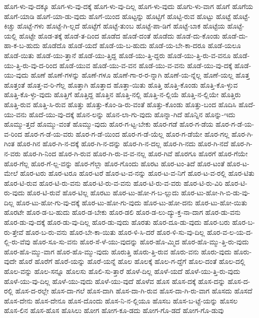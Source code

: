 {ಹೊಗ-ಳು-ವು-ದಕ್ಕೂ
ಹೊಗ-ಳು-ವು-ದಕ್ಕೆ
ಹೊಗ-ಳು-ವು-ದಿಲ್ಲ
ಹೊಗ-ಳು-ವುದು
ಹೊಗು-ಳು-ವಾಗ
ಹೊಗೆ
ಹೊಗೆಯ
ಹೊಗೆ-ಯಾಡಿ
ಹೊಗೆ-ಯಾ-ಡು-ವುದು
ಹೊಗೆ-ಯಿಂದ
ಹೊಟ್ಟನ್ನು
ಹೊಟ್ಟಿಗೆ
ಹೊಟ್ಟಿ-ರುವ
ಹೊಟ್ಟು
ಹೊಟ್ಟೆ
ಹೊಟ್ಟೆ-ಕಿಚ್ಚು
ಹೊಟ್ಟೆ-ಗಳು
ಹೊಟ್ಟೆ-ಗಿ-ಲ್ಲದೆ
ಹೊಟ್ಟೆಗೆ
ಹೊಟ್ಟೆ-ತುಂಬ
ಹೊಟ್ಟೆ-ಪಾ-ಡಿಗೆ
ಹೊಟ್ಟೆ-ಬಾಕ
ಹೊಟ್ಟೆಯ
ಹೊಟ್ಟೆ-ಯಲ್ಲಿ
ಹೊಟ್ಟೇ
ಹೊಡ-ತಕ್ಕೆ
ಹೊಡೆ-ತ-ದಿಂದ
ಹೊಡೆದ
ಹೊಡೆ-ದಂತೆ
ಹೊಡೆದು
ಹೊಡೆ-ದು-ಕೊಂಡು
ಹೊಡೆ-ದು-ಹಾ-ಕ-ಬ-ಹುದು
ಹೊಡೆದೊ
ಹೊಡೆ-ಯದೆ
ಹೊಡೆ-ಯ-ಬ-ಹುದು
ಹೊಡೆ-ಯ-ಬೇ-ಕಾ-ದರೂ
ಹೊಡೆ-ಯಲೂ
ಹೊಡೆ-ಯಿತು
ಹೊಡೆ-ಯು-ತ್ತಾನೆ
ಹೊಡೆ-ಯು-ತ್ತಿದ್ದ
ಹೊಡೆ-ಯು-ತ್ತಿ-ದ್ದರು
ಹೊಡೆ-ಯು-ತ್ತಿ-ರು-ವ-ವನೂ
ಹೊಡೆ-ಯು-ತ್ತಿ-ರು-ವು-ದ-ರಿಂದ
ಹೊಡೆ-ಯುವ
ಹೊಡೆ-ಯು-ವ-ವನ
ಹೊಡೆ-ಯು-ವ-ವನು
ಹೊಡೆ-ಯು-ವು-ದಕ್ಕೆ
ಹೊಡೆ-ಯು-ವುದು
ಹೊಣೆ
ಹೊಣೆ-ಗಳನ್ನು
ಹೊಣೆ-ಗಳೂ
ಹೊಣೆ-ಗಾ-ರ-ರ-ನ್ನಾಗಿ
ಹೊಣೆ-ಯ-ನ್ನೆಲ್ಲ
ಹೊಣೆ-ಯಲ್ಲ
ಹೊತ್ತ
ಹೊತ್ತಂತೆ
ಹೊತ್ತ-ವ-ರಿ-ಗೆಲ್ಲ
ಹೊತ್ತಾಗಿ
ಹೊತ್ತಾದ
ಹೊತ್ತಾ-ಯಿತು
ಹೊತ್ತಿ
ಹೊತ್ತಿ-ಕೊಂಡು
ಹೊತ್ತಿ-ಕೊ-ಳ್ಳುವ
ಹೊತ್ತಿ-ಕೊ-ಳ್ಳು-ವುದು
ಹೊತ್ತಿಗೆ
ಹೊತ್ತಿದ್ದ
ಹೊತ್ತಿನ
ಹೊತ್ತಿ-ನಲ್ಲಿ
ಹೊತ್ತಿ-ನ-ಲ್ಲಿಯೆ
ಹೊತ್ತಿ-ನ-ಲ್ಲಿಯೇ
ಹೊತ್ತಿರು
ಹೊತ್ತಿ-ರುವ
ಹೊತ್ತಿ-ಸಿ-ರುವ
ಹೊತ್ತು
ಹೊತ್ತು-ಕೊಂ-ಡಿ-ರು-ವಂತೆ
ಹೊತ್ತು-ಕೊಂಡು
ಹೊತ್ತು-ಬಂದ
ಹೊದಿಸಿ
ಹೊದೆ-ಯು-ವನು
ಹೊದೆ-ಯು-ವು-ದಕ್ಕೆ
ಹೊನ-ಲನ್ನು
ಹೊನ-ಲಾ-ಗು-ವುದು
ಹೊನ್ನಾ-ಗಿದೆ
ಹೊನ್ನಿನ
ಹೊನ್ನು-ಇದು
ಹೊಮ್ಮು-ತ್ತದೆ
ಹೊಮ್ಮು-ವಂತೆ
ಹೊಮ್ಮು-ವುದು
ಹೊರ-ಗ-ಟ್ಟ-ಬೇಕು
ಹೊರ-ಗಡೆ
ಹೊರ-ಗ-ಡೆಯ
ಹೊರ-ಗ-ಡೆ-ಯ-ವ-ರಿಂದ
ಹೊರ-ಗ-ಡೆ-ಯ-ವರು
ಹೊರ-ಗ-ಡೆ-ಯಿಂದ
ಹೊರ-ಗ-ಡೆ-ಯೆಲ್ಲ
ಹೊರ-ಗ-ಡೆಯೇ
ಹೊರ-ಗಲ್ಲ
ಹೊರ-ಗಿ-ಗಿಂತ
ಹೊರ-ಗಿನ
ಹೊರ-ಗಿ-ನ-ದಕ್ಕೆ
ಹೊರ-ಗಿ-ನ-ದನ್ನು
ಹೊರ-ಗಿ-ನ-ದಲ್ಲ
ಹೊರ-ಗಿ-ನದು
ಹೊರ-ಗಿ-ನದೆ
ಹೊರ-ಗಿ-ನ-ವರು
ಹೊರ-ಗಿ-ನಿಂದ
ಹೊರ-ಗಿ-ರುವ
ಹೊರ-ಗಿ-ರು-ವ-ವ-ನಲ್ಲ
ಹೊರ-ಗಿವೆ
ಹೊರಗೂ
ಹೊರಗೆ
ಹೊರ-ಗೆಯೇ
ಹೊರ-ಗೆಲ್ಲ
ಹೊರ-ಗೆ-ಲ್ಲ-ವನ್ನು
ಹೊರ-ಗೆಲ್ಲಾ
ಹೊರ-ಗೊಂದು
ಹೊರಟ
ಹೊರ-ಟಂ-ತಿದೆ
ಹೊರ-ಟಂತೆ
ಹೊರ-ಟ-ಮೇಲೆ
ಹೊರ-ಟರು
ಹೊರ-ಟರೂ
ಹೊರ-ಟರೆ
ಹೊರ-ಟ-ವ-ನನ್ನು
ಹೊರ-ಟ-ವ-ನಿಗೆ
ಹೊರ-ಟ-ವ-ರಲ್ಲಿ
ಹೊರ-ಟಿತು
ಹೊರ-ಟಿ-ರುವ
ಹೊರ-ಟಿ-ರು-ವನು
ಹೊರ-ಟಿ-ರು-ವ-ವನು
ಹೊರ-ಟಿ-ರು-ವ-ವರು
ಹೊರ-ಟಿ-ರು-ವಿರಿ
ಹೊರ-ಟಿ-ರು-ವುದು
ಹೊರ-ಟಿ-ರುವೆ
ಹೊರ-ಟಿಲ್ಲ
ಹೊರಟು
ಹೊರ-ಟು-ಹೋ-ಗ-ಬ-ಲ್ಲುದು
ಹೊರ-ಟು-ಹೋ-ಗಿ-ಬಿ-ಡು-ವು-ದಿಲ್ಲ
ಹೊರ-ಟು-ಹೋ-ಗು-ವು-ದಕ್ಕೆ
ಹೊರ-ಟು-ಹೋ-ಗು-ವುದು
ಹೊರ-ಟು-ಹೋ-ದನು
ಹೊರ-ಟು-ಹೋ-ಯಿತು
ಹೊರಟೇ
ಹೊರ-ಡ-ಬ-ಹುದು
ಹೊರ-ಡ-ಬೇಕು
ಹೊರ-ಡಲಿ
ಹೊರ-ಡ-ಲು-ದ್ಯು-ಕ್ತ-ನಾ-ದಾಗ
ಹೊರ-ಡು-ವನು
ಹೊರ-ಡು-ವು-ದಕ್ಕೆ
ಹೊರ-ಡು-ವು-ದಿಲ್ಲ
ಹೊರ-ಡು-ವುದು
ಹೊರತು
ಹೊರ-ದೂ-ಡು-ವುದು
ಹೊರ-ಬರು
ಹೊರ-ಬ-ರು-ತ್ತೇವೆ
ಹೊರ-ಬ-ರು-ವನು
ಹೊರ-ಬೇ-ಕಾ-ಯಿತು
ಹೊರ-ಳಿ-ಸಿ-ದರೆ
ಹೊರ-ಳಿ-ಸು-ವು-ದಿಲ್ಲ
ಹೊರ-ವ-ಲ-ಯ-ದ-ಲ್ಲಿ-ರು-ವೆವು
ಹೊರ-ಸೂ-ಸು-ವನು
ಹೊರ-ಸೆ-ಳೆ-ಯು-ವುದನ್ನು
ಹೊರ-ಹೊ-ಮ್ಮಿದ
ಹೊರ-ಹೊ-ಮ್ಮು-ತ್ತಿ-ರು-ವುದು
ಹೊರ-ಹೊ-ಮ್ಮು-ವಾಗ
ಹೊರ-ಹೊ-ಮ್ಮು-ವುದು
ಹೊರುತ್ತಿ
ಹೊರು-ತ್ತಿ-ರುವ
ಹೊರು-ವನು
ಹೊರು-ವುದು
ಹೊರು-ವುದೇ
ಹೊರೆ
ಹೊರೆಗೆ
ಹೊರೆ-ಯನ್ನು
ಹೊರೆ-ಯನ್ನೆ
ಹೊಲ
ಹೊಲಕ್ಕೆ
ಹೊಲ-ಗ-ದ್ದೆಗೆ
ಹೊಲ-ದಂತೆ
ಹೊಲ-ದಲ್ಲಿ
ಹೊಲ-ವನ್ನು
ಹೊಲ-ಸನ್ನೂ
ಹೊಲಸು
ಹೊಲಿ-ಸು-ತ್ತಾರೆ
ಹೊಳೆ-ದಿಲ್ಲ
ಹೊಳೆ-ಯದೆ
ಹೊಳೆ-ಯು-ತ್ತಿ-ರು-ವುದು
ಹೊಳೆ-ಯು-ವು-ದಿಲ್ಲ
ಹೊಳೆ-ಯು-ವುದು
ಹೊಳೆ-ಯು-ವುದೆ
ಹೊಳೆವ
ಹೊಸ
ಹೊಸ-ದಕ್ಕೆ
ಹೊಸ-ದನ್ನು
ಹೊಸ-ದ-ರಲ್ಲಿ
ಹೊಸ-ದ-ರಲ್ಲೇ
ಹೊಸ-ದಾ-ಗಲೆ
ಹೊಸ-ದಾಗಿ
ಹೊಸ-ದಾ-ಗಿ-ರುವ
ಹೊಸ-ದಾ-ಗಿ-ರು-ವಾಗ
ಹೊಸದು
ಹೊಸದೆ
ಹೊಸ-ದೇನು
ಹೊಸ-ದೇನೂ
ಹೊಸ-ದೊಂದು
ಹೊಸ-ನಿ-ನ-ಲ್ಲಿಯೂ
ಹೊಸಬ
ಹೊಸ-ಬ-ಟ್ಟೆ-ಯನ್ನು
ಹೊಸಲ
ಹೊಸ-ಲಿನ
ಹೊಸ-ಹೊಸ
ಹೊಸಿಲು
ಹೋಗ
ಹೋಗ-ಕೂ-ಡದು
ಹೋಗ-ಗೊ-ಡದೆ
ಹೋಗ-ಗೊ-ಡುವು
}
